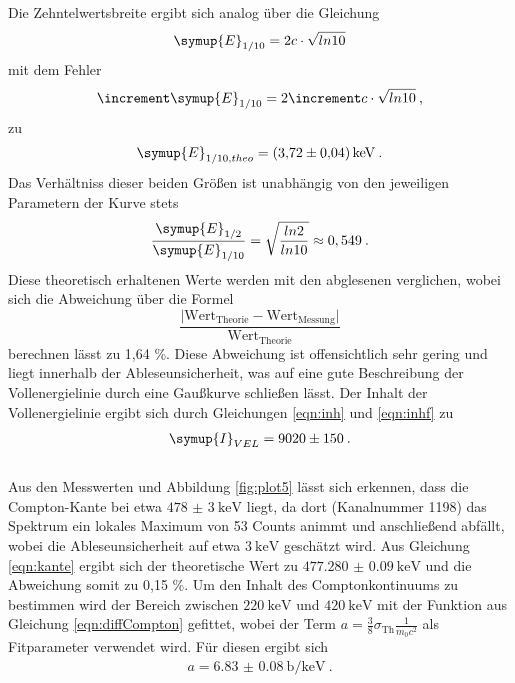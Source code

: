Die Zehntelwertsbreite ergibt sich analog über die Gleichung
\begin{equation}
  \symup{E}_{1/10} = 2c\cdot\sqrt{ln10}
\end{equation}
mit dem Fehler
\begin{equation}
  \increment \symup{E}_{1/10} = 2\increment c\cdot\sqrt{ln10} \: ,
\end{equation}
zu
\begin{align*}
  \symup{E}_{1/10, theo} = \SI{3.72(4)}{\kilo\electronvolt} \: .
\end{align*}
Das Verhältniss dieser beiden Größen ist unabhängig von den jeweiligen Parametern der
Kurve stets
\begin{equation}
  \frac{\symup{E}_{1/2}}{\symup{E}_{1/10}} = \sqrt{\frac{ln2}{ln10}}
  \approx 0,549 \: .
\end{equation}
Diese theoretisch erhaltenen Werte werden mit den abglesenen verglichen, wobei sich
die Abweichung über die Formel
\begin{equation}
  \frac{\lvert \text{Wert}_{\text{Theorie}}-\text{Wert}_{\text{Messung}}\rvert}{\text{Wert}_{\text{Theorie}}}
  \label{eqn:abw}
\end{equation}
berechnen lässt zu 1,64 \%. Diese Abweichung ist offensichtlich sehr gering und liegt innerhalb der
Ableseunsicherheit, was auf eine gute Beschreibung der Vollenergielinie
durch eine Gaußkurve schließen lässt.
Der Inhalt der Vollenergielinie ergibt sich durch Gleichungen \ref{eqn:inh}
und \ref{eqn:inhf} zu
\begin{align*}
  \symup{I}_{VEL} =  9020 \pm 150 \: .
\end{align*}
\\
Aus den Messwerten und Abbildung \ref{fig:plot5} lässt sich erkennen, dass die
Compton-Kante bei etwa $\SI{478(3)}{\kilo\electronvolt}$ liegt, da dort (Kanalnummer
1198) das Spektrum ein lokales
Maximum von 53 Counts animmt und anschließend abfällt, wobei die Ableseunsicherheit auf etwa
$\SI{3}{\kilo\electronvolt}$ geschätzt wird.
Aus Gleichung \ref{eqn:kante} ergibt sich der theoretische Wert zu $\SI{477.280(90)}{\kilo\electronvolt}$
und die Abweichung somit zu 0,15 \%.
Um den Inhalt des Comptonkontinuums zu bestimmen wird der Bereich zwischen $\SI{220}{\kilo\electronvolt}$
und $\SI{420}{\kilo\electronvolt}$ mit der Funktion aus Gleichung \ref{eqn:diffCompton} gefittet,
wobei der Term $a =\frac{3}{8}\sigma_{\text{Th}}\frac{1}{m_0 c^2}$ als Fitparameter
verwendet wird. Für diesen ergibt sich
\begin{align*}
  a =  \SI{6.83(8)}{\barn\per\kilo\electronvolt}\: .
\end{align*}

